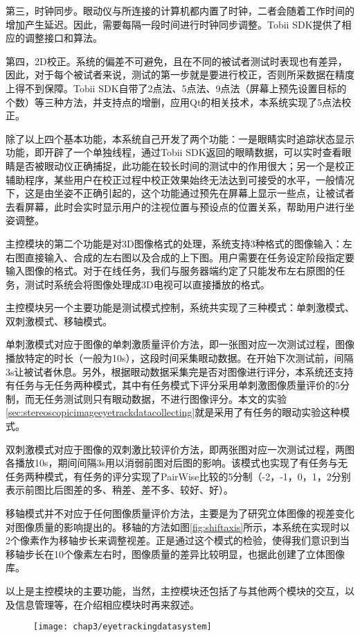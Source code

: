 第三，时钟同步。眼动仪与所连接的计算机都内置了时钟，二者会随着工作时间的增加产生延迟。因此，需要每隔一段时间进行时钟同步调整。Tobii SDK提供了相应的调整接口和算法。

第四，2D校正。系统的偏差不可避免，且在不同的被试者测试时表现也有差异，因此，对于每个被试者来说，测试的第一步就是要进行校正，否则所采数据在精度上得不到保障。Tobii SDK自带了2点法、5点法、9点法（屏幕上预先设置目标的个数）等三种方法，并支持点的增删，应用Qt的相关技术，本系统实现了5点法校正。

除了以上四个基本功能，本系统自己开发了两个功能：一是眼睛实时追踪状态显示功能，即开辟了一个单独线程，通过Tobii SDK返回的眼睛数据，可以实时查看眼睛是否被眼动仪正确捕捉，此功能在较长时间的测试中的作用很大；另一个是校正辅助程序，某些用户在校正过程中校正效果始终无法达到可接受的水平，一般情况下，这是由坐姿不正确引起的，这个功能通过预先在屏幕上显示一些点，让被试者去看屏幕，此时会实时显示用户的注视位置与预设点的位置关系，帮助用户进行坐姿调整。

主控模块的第二个功能是对3D图像格式的处理，系统支持3种格式的图像输入：左右图直接输入、合成的左右图以及合成的上下图。用户需要在任务设定阶段指定要输入图像的格式。对于在线任务，我们与服务器端约定了只能发布左右原图的任务，测试时系统会将图像处理成3D电视可以直接播放的格式。

主控模块另一个主要功能是测试模式控制，系统共实现了三种模式：单刺激模式、双刺激模式、移轴模式。

单刺激模式对应于图像的单刺激质量评价方法，即一张图对应一次测试过程，图像播放特定的时长（一般为10s），这段时间采集眼动数据。在开始下次测试前，间隔3s让被试者休息。另外，根据眼动数据采集完是否对图像进行评分，本系统还支持有任务与无任务两种模式，其中有任务模式下评分采用单刺激图像质量评价的5分制，而无任务测试则只有眼动数据，不进行图像评分。本文的实验\ref{sec:stereoscopicimageeyetrackdatacollecting}就是采用了有任务的眼动实验这种模式。

双刺激模式对应于图像的双刺激比较评价方法，即两张图对应一次测试过程，两图各播放10s，期间间隔3s用以消弱前图对后图的影响。该模式也实现了有任务与无任务两种模式，有任务的评分实现了PairWise比较的5分制（-2，-1，0，1，2分别表示前图比后图差的多、稍差、差不多、较好、好）。

移轴模式并不对应于任何图像质量评价方法，主要是为了研究立体图像的视差变化对图像质量的影响提出的。移轴的方法如图\ref{fig:shiftaxis}所示，本系统在实现时以2个像素作为移轴步长来调整视差。正是通过这个模式的检验，使得我们意识到当移轴步长在10个像素左右时，图像质量的差异比较明显，也据此创建了立体图像库。

以上是主控模块的主要功能，当然，主控模块还包括了与其他两个模块的交互，以及信息管理等，在介绍相应模块时再来叙述。
\begin{figure}[t]
  \centering
  \texttt{[image: chap3/eyetrackingdatasystem]}
\end{figure}
